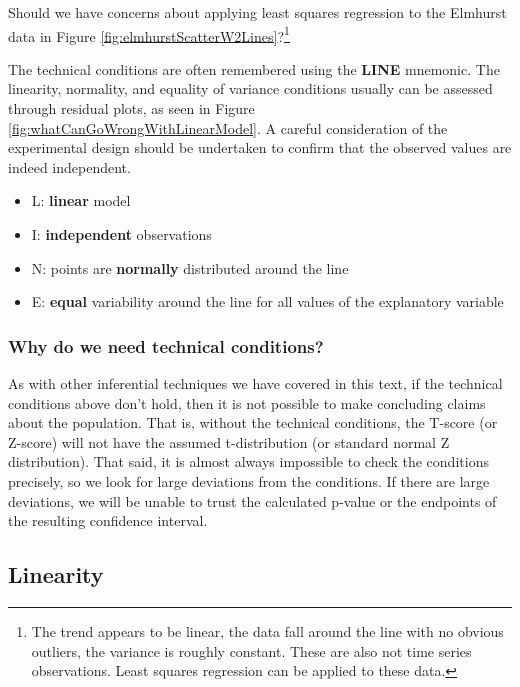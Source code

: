 \documentclass[
  10pt,
  openany]{book}
\providecommand{\tightlist}{%
  \setlength{\itemsep}{0pt}\setlength{\parskip}{0pt}}
\theoremstyle{definition}
\theoremstyle{definition}
\theoremstyle{definition}
\theoremstyle{definition}
\theoremstyle{remark}
\begin{document}
Should we have concerns about applying least squares regression to the
Elmhurst data in Figure \ref{fig:elmhurstScatterW2Lines}?\footnote{The trend appears to be linear, the data fall around the line with no obvious outliers, the variance is roughly constant. These are also not time series observations. Least squares regression can be applied to these data.}

The technical conditions are often remembered using the \textbf{LINE} mnemonic.
The linearity, normality, and equality of variance conditions usually can be assessed through residual plots, as seen in Figure \ref{fig:whatCanGoWrongWithLinearModel}.
A careful consideration of the experimental design should be undertaken to confirm that the observed values are indeed independent.

\begin{itemize}
\tightlist
\item
  L: \textbf{linear} model
\item
  I: \textbf{independent} observations
\item
  N: points are \textbf{normally} distributed around the line
\item
  E: \textbf{equal} variability around the line for all values of the explanatory variable
\end{itemize}

\subsubsection*{Why do we need technical conditions?}\label{why-do-we-need-technical-conditions}

As with other inferential techniques we have covered in this text, if the technical conditions above don't hold, then it is not possible to make concluding claims about the population.
That is, without the technical conditions, the T-score (or Z-score) will not have the assumed t-distribution (or standard normal Z distribution).
That said, it is almost always impossible to check the conditions precisely, so we look for large deviations from the conditions.
If there are large deviations, we will be unable to trust the calculated p-value or the endpoints of the resulting confidence interval.

\subsection{\texorpdfstring{\textbf{L}inearity}{Linearity}}\label{linearity}
\end{document}
